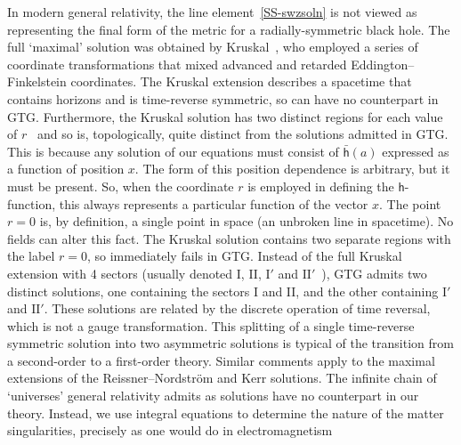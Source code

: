 \documentclass[a4paper]{article}
\numberwithin{equation}{section}
\newcommand{\lih}{\mathsf{h}}
\newcommand{\lbh}{\bar{\mathsf{h}}}
\newcommand{\ho}{\lbh}
\begin{document}
In modern general relativity, the line element~\eqref{SS-swzsoln} is
not viewed as representing the final form of the metric for a
radially-symmetric black hole.  The full `maximal' solution was
obtained by Kruskal~\cite{kru60}, who employed a series of coordinate
transformations that mixed advanced and retarded Eddington--Finkelstein
coordinates.  The Kruskal extension describes a spacetime that
contains horizons and is time-reverse symmetric, so can have no
counterpart in GTG.  Furthermore, the Kruskal solution has two
distinct regions for each value of $r$~\cite{haw-large} and so is,
topologically, quite distinct from the solutions admitted in GTG.
This is because any solution of our equations must consist of $\ho(a)$
expressed as a function of position $x$.  The form of this position
dependence is arbitrary, but it must be present.  So, when the
coordinate $r$ is employed in defining the $\lih$-function, this
always represents a particular function of the vector $x$.  The point
$r=0$ is, by definition, a single point in space (an unbroken line in
spacetime).  No fields can alter this fact.  The Kruskal solution
contains two separate regions with the label $r=0$, so immediately
fails in GTG.  Instead of the full Kruskal extension with 4 sectors
(usually denoted I, II, $\mbox{I}'$ and
$\mbox{II}'$~\cite{haw-large}), GTG admits two distinct solutions, one
containing the sectors I and II, and the other containing $\mbox{I}'$
and $\mbox{II}'$.  These solutions are related by the discrete
operation of time reversal, which is not a gauge transformation.  This
splitting of a single time-reverse symmetric solution into two
asymmetric solutions is typical of the transition from a second-order
to a first-order theory.  Similar comments apply to the maximal
extensions of the Reissner--Nordstr\"{o}m and Kerr solutions.  The
infinite chain of `universes' general relativity admits as solutions
have no counterpart in our theory.  Instead, we use integral equations
to determine the nature of the matter singularities, precisely as one
would do in electromagnetism~\cite{DL04-KS}
\end{document}
